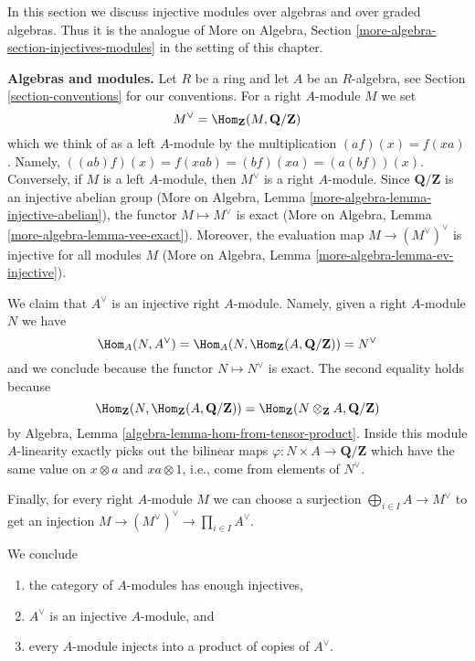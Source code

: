 \noindent
In this section we discuss injective modules over algebras
and over graded algebras. Thus it is the analogue of
More on Algebra, Section \ref{more-algebra-section-injectives-modules}
in the setting of this chapter.

\medskip\noindent
{\bf Algebras and modules.} Let $R$ be a ring and let $A$ be an
$R$-algebra, see Section \ref{section-conventions} for our conventions.
For a right $A$-module $M$ we set
$$
M^\vee = \Hom_\mathbf{Z}(M, \mathbf{Q}/\mathbf{Z})
$$
which we think of as a left $A$-module by the multiplication
$(a f)(x) = f(xa)$. Namely, $((ab)f)(x) = f(xab) = (bf)(xa) = (a(bf))(x)$.
Conversely, if $M$ is a left $A$-module, then $M^\vee$ is a right
$A$-module. Since $\mathbf{Q}/\mathbf{Z}$ is an injective abelian
group (More on Algebra, Lemma \ref{more-algebra-lemma-injective-abelian}), the
functor $M \mapsto M^\vee$ is exact
(More on Algebra, Lemma \ref{more-algebra-lemma-vee-exact}).
Moreover, the evaluation map $M \to (M^\vee)^\vee$ is
injective for all modules $M$
(More on Algebra, Lemma \ref{more-algebra-lemma-ev-injective}).

\medskip\noindent
We claim that $A^\vee$ is an injective right $A$-module. Namely, given
a right $A$-module $N$ we have
$$
\Hom_A(N, A^\vee) =
\Hom_A(N, \Hom_\mathbf{Z}(A, \mathbf{Q}/\mathbf{Z})) = N^\vee
$$
and we conclude because the functor $N \mapsto N^\vee$ is exact.
The second equality holds because
$$
\Hom_\mathbf{Z}(N, \Hom_\mathbf{Z}(A, \mathbf{Q}/\mathbf{Z})) =
\Hom_\mathbf{Z}(N \otimes_\mathbf{Z} A, \mathbf{Q}/\mathbf{Z})
$$
by Algebra, Lemma \ref{algebra-lemma-hom-from-tensor-product}.
Inside this module $A$-linearity exactly picks out the bilinear maps
$\varphi : N \times A \to \mathbf{Q}/\mathbf{Z}$ which
have the same value on $x \otimes a$ and $xa \otimes 1$, i.e.,
come from elements of $N^\vee$.

\medskip\noindent
Finally, for every right $A$-module $M$ we can choose a surjection
$\bigoplus_{i \in I} A \to M^\vee$ to get an injection
$M \to (M^\vee)^\vee \to \prod_{i \in I} A^\vee$.

\medskip\noindent
We conclude
\begin{enumerate}
\item the category of $A$-modules has enough injectives,
\item $A^\vee$ is an injective $A$-module, and
\item every $A$-module injects into a product of copies of $A^\vee$.
\end{enumerate}


